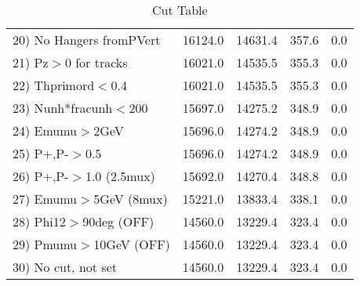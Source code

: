 \begin{table}[h!]
\begin{tabular}{||l||r|r|r|r||}
 20) No Hangers fromPVert &     16124.0 &     14631.4 &       357.6 &         0.0 \\
 21) Pz$>$0 for tracks    &     16021.0 &     14535.5 &       355.3 &         0.0 \\
 22) Thprimord$<$0.4      &     16021.0 &     14535.5 &       355.3 &         0.0 \\
 23) Nunh*fracunh$<$200   &     15697.0 &     14275.2 &       348.9 &         0.0 \\
 24) Emumu$>$2GeV         &     15696.0 &     14274.2 &       348.9 &         0.0 \\
 25) P+,P-$>$0.5          &     15696.0 &     14274.2 &       348.9 &         0.0 \\
 26) P+,P-$>$1.0 (2.5mux) &     15692.0 &     14270.4 &       348.8 &         0.0 \\
 27) Emumu$>$5GeV  (8mux) &     15221.0 &     13833.4 &       338.1 &         0.0 \\
 28) Phi12$>$90deg  (OFF) &     14560.0 &     13229.4 &       323.4 &         0.0 \\
 29) Pmumu$>$10GeV  (OFF) &     14560.0 &     13229.4 &       323.4 &         0.0 \\
 30) No cut, not set      &     14560.0 &     13229.4 &       323.4 &         0.0 \\
 \hline
 \hline
 \end{tabular}
 \caption{Cut Table \cohpip }
 \label{tab-cut_copip}
 \end{table}
